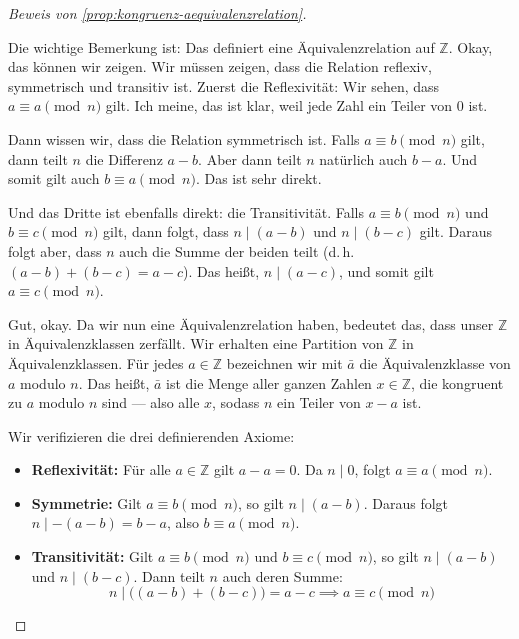 \begin{proof}[Beweis von \cref{prop:kongruenz-aequivalenzrelation}]
\begin{spoken-clean}[01:18:25 - 01:20:46]
Die wichtige Bemerkung ist: Das definiert eine Äquivalenzrelation auf $\mathbb{Z}$. Okay, das können wir zeigen. Wir müssen zeigen, dass die Relation reflexiv, symmetrisch und transitiv ist. Zuerst die Reflexivität: Wir sehen, dass $a \equiv a \pmod n$ gilt. Ich meine, das ist klar, weil jede Zahl ein Teiler von $0$ ist.

Dann wissen wir, dass die Relation symmetrisch ist. Falls $a \equiv b \pmod n$ gilt, dann teilt $n$ die Differenz $a - b$. Aber dann teilt $n$ natürlich auch $b - a$. Und somit gilt auch $b \equiv a \pmod n$. Das ist sehr direkt.

Und das Dritte ist ebenfalls direkt: die Transitivität. Falls $a \equiv b \pmod n$ und $b \equiv c \pmod n$ gilt, dann folgt, dass $n \mid (a - b)$ und $n \mid (b - c)$ gilt. Daraus folgt aber, dass $n$ auch die Summe der beiden teilt (d.\,h. $(a - b) + (b - c) = a - c$). Das heißt, $n \mid (a - c)$, und somit gilt $a \equiv c \pmod n$.

Gut, okay. Da wir nun eine Äquivalenzrelation haben, bedeutet das, dass unser $\mathbb{Z}$ in Äquivalenzklassen zerfällt. Wir erhalten eine Partition von $\mathbb{Z}$ in Äquivalenzklassen. Für jedes $a \in \mathbb{Z}$ bezeichnen wir mit $\bar{a}$ die Äquivalenzklasse von $a$ modulo $n$. Das heißt, $\bar{a}$ ist die Menge aller ganzen Zahlen $x \in \mathbb{Z}$, die kongruent zu $a$ modulo $n$ sind --- also alle $x$, sodass $n$ ein Teiler von $x - a$ ist.
\end{spoken-clean}

\begin{math-stroke}
Wir verifizieren die drei definierenden Axiome:
\begin{itemize}
    \item \textbf{Reflexivität:} Für alle $a \in \mathbb{Z}$ gilt $a - a = 0$. Da $n \mid 0$, folgt $a \equiv a \pmod n$.
    \item \textbf{Symmetrie:} Gilt $a \equiv b \pmod n$, so gilt $n \mid (a - b)$. Daraus folgt $n \mid -(a - b) = b - a$, also $b \equiv a \pmod n$.
    \item \textbf{Transitivität:} Gilt $a \equiv b \pmod n$ und $b \equiv c \pmod n$, so gilt $n \mid (a - b)$ und $n \mid (b - c)$. Dann teilt $n$ auch deren Summe:
    \[ n \mid \bigl( (a - b) + (b - c) \bigr) = a - c \implies a \equiv c \pmod n \]
\end{itemize}
\end{math-stroke}
\end{proof}

